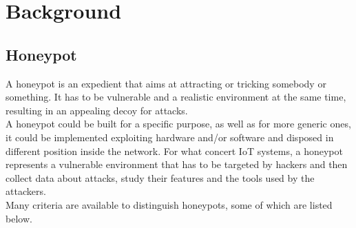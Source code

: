 \chapter{Background}
\section{Honeypot}
A honeypot is an expedient that aims at attracting or tricking somebody or something. It  has to be vulnerable and a realistic environment at the same time, resulting in an appealing decoy for attacks.\\
A honeypot could be built for a specific purpose, as well as for more generic ones, it could be implemented exploiting hardware and/or software and disposed in different position inside the network.
For what concert IoT systems, a honeypot represents a vulnerable environment that has to be targeted by hackers and then collect data about attacks, study their features and the tools used by the attackers. \\
Many criteria are available to distinguish honeypots, some of which are listed below. 

